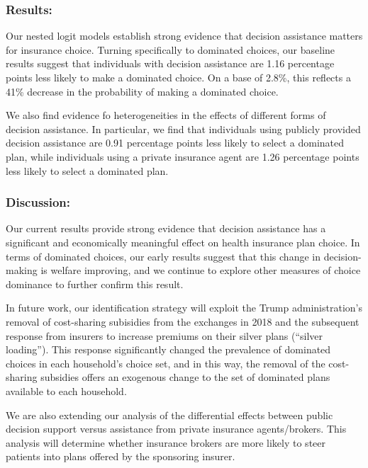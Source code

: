 \documentclass[12pt,]{article}
\begin{document}
\hypertarget{results}{%
\subsubsection{Results:}\label{results}}

Our nested logit models establish strong evidence that decision
assistance matters for insurance choice. Turning specifically to
dominated choices, our baseline results suggest that individuals with
decision assistance are 1.16 percentage points less likely to make a
dominated choice. On a base of 2.8\%, this reflects a 41\% decrease in
the probability of making a dominated choice.

We also find evidence fo heterogeneities in the effects of different
forms of decision assistance. In particular, we find that individuals
using publicly provided decision assistance are 0.91 percentage points
less likely to select a dominated plan, while individuals using a
private insurance agent are 1.26 percentage points less likely to select
a dominated plan.

\hypertarget{discussion}{%
\subsubsection{Discussion:}\label{discussion}}

Our current results provide strong evidence that decision assistance has
a significant and economically meaningful effect on health insurance
plan choice. In terms of dominated choices, our early results suggest
that this change in decision-making is welfare improving, and we
continue to explore other measures of choice dominance to further
confirm this result.

In future work, our identification strategy will exploit the Trump
administration's removal of cost-sharing subisidies from the exchanges
in 2018 and the subsequent response from insurers to increase premiums
on their silver plans (``silver loading''). This response significantly
changed the prevalence of dominated choices in each household's choice
set, and in this way, the removal of the cost-sharing subsidies offers
an exogenous change to the set of dominated plans available to each
household.

We are also extending our analysis of the differential effects between
public decision support versus assistance from private insurance
agents/brokers. This analysis will determine whether insurance brokers
are more likely to steer patients into plans offered by the sponsoring
insurer.
\end{document}
